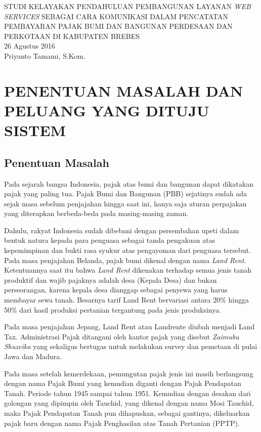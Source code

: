 \documentclass[pdftex, 12pt, oneside]{article}
\begin{document}
\sloppy

\begin{center}
{\large STUDI KELAYAKAN PENDAHULUAN PEMBANGUNAN LAYANAN \textit{WEB SERVICES} SEBAGAI CARA KOMUNIKASI DALAM PENCATATAN PEMBAYARAN PAJAK BUMI DAN BANGUNAN PERDESAAN DAN PERKOTAAN DI KABUPATEN BREBES}\\[1cm]
26 Agustus 2016\\
Priyanto Tamami, S.Kom.
\end{center}

\section{PENENTUAN MASALAH DAN PELUANG YANG DITUJU SISTEM}
                                               
\subsection{Penentuan Masalah}           

Pada sejarah bangsa Indonesia, pajak atas bumi dan bangunan dapat dikatakan pajak yang paling tua. Pajak Bumi dan Bangunan (PBB) sejatinya sudah ada sejak masa sebelum penjajahan hingga saat ini, hanya saja aturan perpajakan yang diterapkan berbeda-beda pada masing-masing zaman. 

Dahulu, rakyat Indonesia sudah dibebani dengan persembahan upeti dalam bentuk natura kepada para penguasa sebagai tanda pengakuan atas kepemimpinan dan bukti rasa syukur atas pengayoman dari penguasa tersebut. Pada masa penjajahan Belanda, pajak bumi dikenal dengan nama \textit{Land Rent}. Ketentuannya saat itu bahwa \textit{Land Rent} dikenakan terhadap semua jenis tanah produktif dan wajib pajaknya adalah desa (Kepala Desa) dan bukan perseorangan, karena kepala desa dianggap sebagai penyewa yang harus membayar sewa tanah. Besarnya tarif Land Rent bervariasi antara 20\% hingga 50\% dari hasil produksi pertanian tergantung pada jenis produksinya.

Pada masa penjajahan Jepang, Land Rent atau Landrente diubah menjadi Land Tax. Administrasi Pajak ditangani oleh kantor pajak yang disebut \textit{Zaimubu Shuzeika} yang sekaligus bertugas untuk melakukan survey dan pemetaan di pulai Jawa dan Madura.

Pada masa setelah kemerdekaan, pemungutan pajak jenis ini masih berlangsung dengan nama Pajak Bumi yang kemudian diganti dengan Pajak Pendapatan Tanah. Periode tahun 1945 sampai tahun 1951. Kemudian dengan desakan dari golongan yang dipimpin oleh Tauchid, yang dikenal dengan nama Mosi Tauchid, maka Pajak Pendapatan Tanah pun dihapuskan, sebagai gantinya, dikeluarkan pajak baru dengan nama Pajak Penghasilan atas Tanah Pertanian (PPTP).
\end{document}
